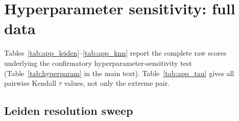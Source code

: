 \documentclass[9pt,lineno]{elife}
\begin{document}



\appendix

\section{Hyperparameter sensitivity: full data}
\label{app:hyperparam}

Tables~\ref{tab:app_leiden}--\ref{tab:app_knn} report the complete raw scores underlying the confirmatory hyperparameter-sensitivity test (Table~\ref{tab:hyperparam} in the main text). Table~\ref{tab:app_tau} gives all pairwise Kendall $\tau$ values, not only the extreme pair.

\subsection{Leiden resolution sweep}
\end{document}
